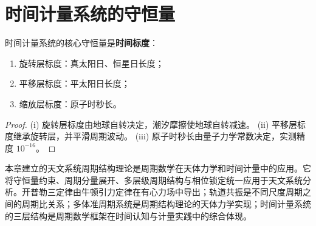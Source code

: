 \section{时间计量系统的守恒量}

\begin{proposition}[时间计量的标度守恒]\label{prop:time_scale_charge_conservation}
时间计量系统的核心守恒量是\textbf{时间标度}：
\begin{enumerate}[label=(\roman*)]
    \item 旋转层标度：真太阳日、恒星日长度；
    \item 平移层标度：平太阳日长度；
    \item 缩放层标度：原子时秒长。
\end{enumerate}
\end{proposition}

\begin{proof}
(i) 旋转层标度由地球自转决定，潮汐摩擦使地球自转减速。
(ii) 平移层标度继承旋转层，并平滑周期波动。
(iii) 原子时秒长由量子力学常数决定，实测精度 \(10^{-16}\)。
\end{proof}

\begin{remark}[与全书的衔接]
本章建立的天文系统周期结构理论是周期数学在天体力学和时间计量中的应用。它将守恒量约束、周期分量展开、多层级周期结构与相位锁定统一应用于天文系统分析。开普勒三定律由牛顿引力定律在有心力场中导出；轨道共振是不同尺度周期之间的周期比关系；多体准周期系统是周期结构理论的天体力学实现；时间计量系统的三层结构是周期数学框架在时间认知与计量实践中的综合体现。
\end{remark}

